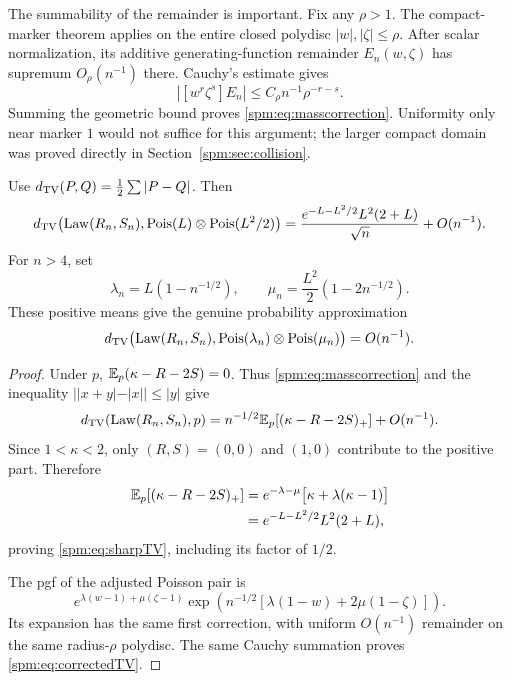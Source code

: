 The summability of the remainder is important. Fix any $\rho>1$. The compact-marker theorem applies on the entire closed polydisc $|w|,|\zeta|\leq\rho$. After scalar normalization, its additive generating-function remainder $E_n(w,\zeta)$ has supremum $O_\rho(n^{-1})$ there. Cauchy's estimate gives
\[
 |[w^r\zeta^s]E_n|\leq C_\rho n^{-1}\rho^{-r-s}.
\]
Summing the geometric bound proves \eqref{spm:eq:masscorrection}. Uniformity only near marker $1$ would not suffice for this argument; the larger compact domain was proved directly in Section~\ref{spm:sec:collision}.

\begin{theorem}\label{spm:thm:TV}
Use $d_{\mathrm{TV}}(P,Q)=\frac12\sum|P-Q|$. Then
\begin{equation}\label{spm:eq:sharpTV}
 d_{\mathrm{TV}}\bigl(\operatorname{Law}(R_n,S_n),\operatorname{Pois}(L)\otimes\operatorname{Pois}(L^2/2)\bigr)
 =\frac{e^{-L-L^2/2}L^2(2+L)}{\sqrt n}+O(n^{-1}).
\end{equation}
For $n>4$, set
\begin{equation}\label{spm:eq:adjustedmeans}
 \lambda_n=L(1-n^{-1/2}),\qquad
 \mu_n=\frac{L^2}{2}(1-2n^{-1/2}).
\end{equation}
These positive means give the genuine probability approximation
\begin{equation}\label{spm:eq:correctedTV}
 d_{\mathrm{TV}}\bigl(\operatorname{Law}(R_n,S_n),\operatorname{Pois}(\lambda_n)\otimes\operatorname{Pois}(\mu_n)\bigr)
 =O(n^{-1}).
\end{equation}
\end{theorem}
\begin{proof}
Under $p$, $\mathbb E_p(\kappa-R-2S)=0$. Thus \eqref{spm:eq:masscorrection} and the inequality $||x+y|-|x||\leq|y|$ give
\[
 d_{\mathrm{TV}}(\operatorname{Law}(R_n,S_n),p)
 =n^{-1/2}\mathbb E_p[(\kappa-R-2S)_+]+O(n^{-1}).
\]
Since $1<\kappa<2$, only $(R,S)=(0,0)$ and $(1,0)$ contribute to the positive part. Therefore
\begin{align*}
 \mathbb E_p[(\kappa-R-2S)_+]
 &=e^{-\lambda-\mu}\bigl[\kappa+\lambda(\kappa-1)\bigr]\\
 &=e^{-L-L^2/2}L^2(2+L),
\end{align*}
proving \eqref{spm:eq:sharpTV}, including its factor of $1/2$.

The pgf of the adjusted Poisson pair is
\[
 e^{\lambda(w-1)+\mu(\zeta-1)}
 \exp\left(n^{-1/2}[\lambda(1-w)+2\mu(1-\zeta)]\right).
\]
Its expansion has the same first correction, with uniform $O(n^{-1})$ remainder on the same radius-$\rho$ polydisc. The same Cauchy summation proves \eqref{spm:eq:correctedTV}.
\end{proof}


